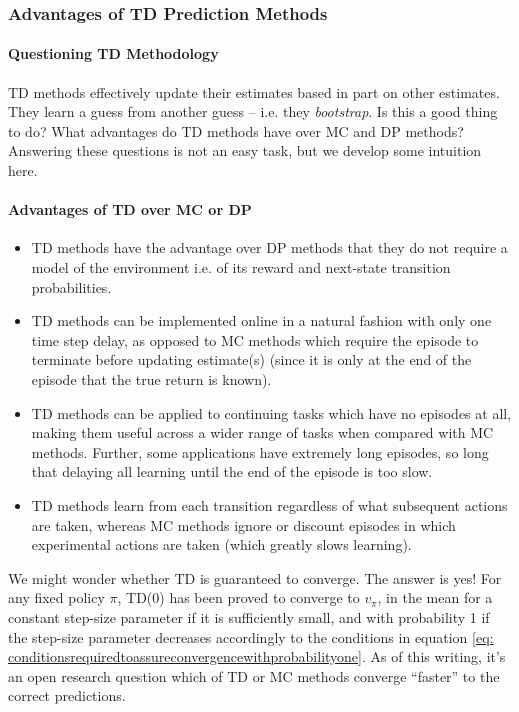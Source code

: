 \documentclass[12pt]{article}
\begin{document}
\subsubsection{Advantages of TD Prediction Methods}
\paragraph{Questioning TD Methodology} TD methods effectively update their estimates based in part on other estimates. They learn a guess from another guess -- i.e. they \emph{bootstrap}. Is this a good thing to do? What advantages do TD methods have over MC and DP methods? Answering these questions is not an easy task, but we develop some intuition here.
\paragraph{Advantages of TD over MC or DP}
\begin{itemize}
\item TD methods have the advantage over DP methods that they do not require a model of the environment i.e. of its reward and next-state transition probabilities.
\item TD methods can be implemented online in a natural fashion with only one time step delay, as opposed to MC methods which require the episode to terminate before updating estimate(s) (since it is only at the end of the episode that the true return is known).
\item TD methods can be applied to continuing tasks which have no episodes at all, making them useful across a wider range of tasks when compared with MC methods. Further, some applications have extremely long episodes, so long that delaying all learning until the end of the episode is too slow.
\item TD methods learn from each transition regardless of what subsequent actions are taken, whereas MC methods ignore or discount episodes in which experimental actions are taken (which greatly slows learning).
\end{itemize}

We might wonder whether TD is guaranteed to converge. The answer is yes! For any fixed policy $\pi$, TD(0) has been proved to converge to $v_\pi$, in the mean for a constant step-size parameter if it is sufficiently small, and with probability 1 if the step-size parameter decreases accordingly to the conditions in equation \ref{eq: conditionsrequiredtoassureconvergencewithprobabilityone}. As of this writing, it's an open research question which of TD or MC methods converge ``faster'' to the correct predictions.
\end{document}
